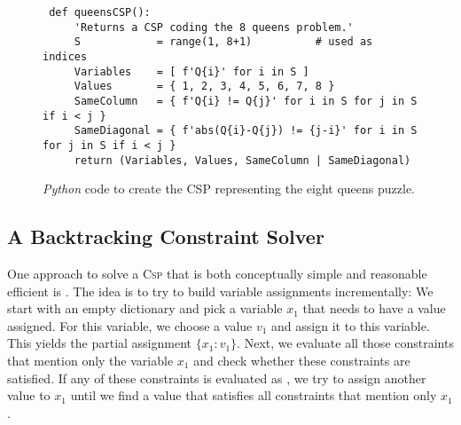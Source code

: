 \begin{figure}[!ht]
\centering
\begin{verbatim}
 def queensCSP():
     'Returns a CSP coding the 8 queens problem.'
     S            = range(1, 8+1)          # used as indices
     Variables    = [ f'Q{i}' for i in S ]
     Values       = { 1, 2, 3, 4, 5, 6, 7, 8 }
     SameColumn   = { f'Q{i} != Q{j}' for i in S for j in S if i < j }
     SameDiagonal = { f'abs(Q{i}-Q{j}) != {j-i}' for i in S for j in S if i < j }
     return (Variables, Values, SameColumn | SameDiagonal)
\end{verbatim}
\vspace*{-0.3cm}
\caption{\textsl{Python} code to create the CSP representing the eight queens puzzle.}
\label{fig:queens-csp.stlx}
\end{figure}


\subsection{A Backtracking Constraint Solver}
One approach to solve a \textsc{Csp} that is both conceptually simple and reasonable efficient is
.  The idea is to try to build variable assignments incrementally:  We start with
an empty dictionary and pick a variable $x_1$ that needs to have a value assigned.  For this variable, we
choose a value $v_1$ and assign it to this variable.  This yields the partial assignment $\{ x_1:v_1 \}$.
Next, we evaluate all those constraints that mention only the variable $x_1$ and check whether these constraints
are satisfied.  If any of these constraints is evaluated as , we try to assign another value to
$x_1$ until we find a value that satisfies all constraints that mention only $x_1$.

